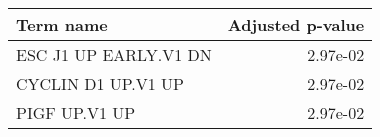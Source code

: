 \begin{tabular}{lr}
\toprule
            Term name &  Adjusted p-value \\
\midrule
ESC J1 UP EARLY.V1 DN &          2.97e-02 \\
   CYCLIN D1 UP.V1 UP &          2.97e-02 \\
        PIGF UP.V1 UP &          2.97e-02 \\
\bottomrule
\end{tabular}
